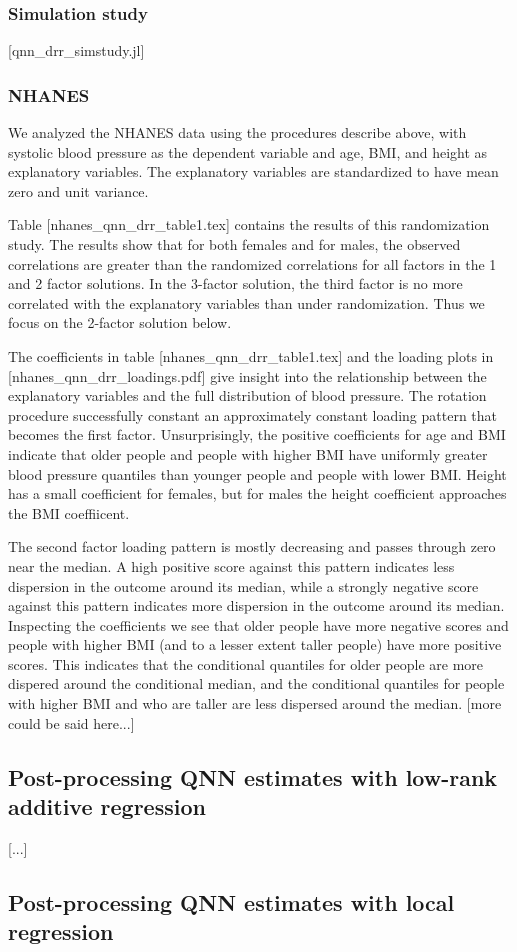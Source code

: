 \subsubsection{Simulation study}

[qnn_drr_simstudy.jl]

\subsubsection{NHANES}

We analyzed the NHANES data using the procedures describe above,
with systolic blood pressure as the dependent variable and age, BMI,
and height as explanatory variables.  The explanatory variables are
standardized to have mean zero and unit variance.

Table [nhanes_qnn_drr_table1.tex] contains the results of this
randomization study.  The results show that for both females and
for males, the observed correlations are greater than the randomized
correlations for all factors in the 1 and 2 factor solutions.  In the
3-factor solution, the third factor is no more correlated with the
explanatory variables than under randomization.  Thus we focus on the
2-factor solution below.

The coefficients in table [nhanes_qnn_drr_table1.tex] and the loading
plots in [nhanes_qnn_drr_loadings.pdf] give insight into the relationship
between the explanatory variables and the full distribution of blood
pressure. The rotation procedure successfully constant an approximately
constant loading pattern that becomes the first factor.  Unsurprisingly,
the positive coefficients for age and BMI indicate that older people
and people with higher BMI have uniformly greater blood pressure
quantiles than younger people and people with lower BMI. Height has
a small coefficient for females, but for males the height coefficient
approaches the BMI coeffiicent.

The second factor loading pattern is mostly decreasing and passes through
zero near the median.  A high positive score against this pattern
indicates less dispersion in the outcome around its median, while a
strongly negative score against this pattern indicates more dispersion
in the outcome around its median.  Inspecting the coefficients we see
that older people have more negative scores and people with higher
BMI (and to a lesser extent taller people) have more positive scores.
This indicates that the conditional quantiles for older people are more
dispered around the conditional median, and the conditional quantiles
for people with higher BMI and who are taller are less dispersed around
the median.  [more could be said here...]

\subsection{Post-processing QNN estimates with low-rank additive
regression}

[...]

\subsection{Post-processing QNN estimates with local regression}

